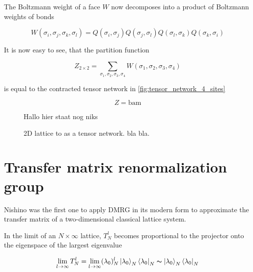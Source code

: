 The Boltzmann weight of a face $W$ now decomposes into a product of Boltzmann weights of
bonds

\begin{equation}
  W(\sigma_i, \sigma_j, \sigma_k, \sigma_l) =
  Q(\sigma_i, \sigma_j)Q(\sigma_j, \sigma_l)Q(\sigma_l, \sigma_k)Q(\sigma_k, \sigma_i)
\end{equation}

It is now easy to see, that the partition function

\begin{equation}
  Z_{2 \times 2} = \sum_{\sigma_1, \sigma_2, \sigma_3, \sigma_4} W(\sigma_1, \sigma_2,
  \sigma_3, \sigma_4)
\end{equation}

is equal to the contracted tensor network in \autoref{fig:tensor_network_4_sites}

\begin{equation}
  Z = \text{bam}
\end{equation}

\begin{figure}
  \caption{Hallo hier staat nog niks}
  \label{fig:tensor_network_4_sites}
\end{figure}








\begin{figure}
  
  \caption{2D lattice to as a tensor network. bla bla.}
  \label{fig:2d_classical_partition_function_as_tensor_network}
\end{figure}


\section{Transfer matrix renormalization group}

Nishino \cite{nishino1995density} was the first one to apply DMRG in its modern
form to approximate the transfer matrix of a two-dimensional classical lattice system.

In the limit of an $N \times \infty$ lattice, $T_{N}^{l}$ becomes proportional
to the projector onto the eigenspace of the largest eigenvalue

\begin{equation}
  \lim_{l \to \infty} T_{N}^{l} = \lim_{l \to \infty} (\lambda_0)_{N}^{l} \ket{\lambda_0}_{N}\bra{\lambda_0}_{N} \thicksim \ket{\lambda_0}_{N}\bra{\lambda_0}_N
\end{equation}

